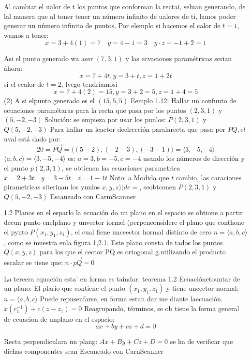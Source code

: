 

Al cambiar el ualor de t los puntos que conforman
la rectai, seluan generando, de lal manera que al
toner tener un número infinito de ualores de ti, lamos poder generar un número infinito de puntos, Por elemplo si hacemos el calor de $t=1$, wamos a tener:
$$
x=3+4(1)=7 \quad y=4-1=3 \quad y \cdot z=-1+2=1
$$

Asi el punto generado wa aser $(7,3,1)$
y las ecvaciones paramétricas serian áhora:
$$
x=7+4 t, y=3+t, z=1+2 t
$$
si el cealor de $t=2$, lvego tendríamosi
$$
x=7+4(2)=15, y=3+2=5, z=1+4=5
$$
(2)
A si elpunto generado es el $(15,5,5)$ Eemplo 1.12: Hallar un confunto de ecuaciones paramétaras para la recta que pasa por los puntos $(2,3,1)$ y $(5,-2,-3)$
Solución: se empieza por usar los punlos: $P(2,3,1)$ y $Q(5,-2,-3)$ Para hallar un leactor declrección paralarecta que pasa por $P Q, e l$ uval está dado por:
$$
20=\overrightarrow{P Q}=\langle(5-2),(-2-3),(-3-1)\rangle=\langle 3,-5,-4\rangle
$$
$\langle a, b, c\rangle=\langle 3,-5,-4\rangle$ es: $a=3, b=-5, c=-4$ usando los números de dirección y el punto $p(2,3,1)$, se obtienen las ecuaciones parametrica $x=2+3 t \quad y=3-5 t \quad z=1-4 t$
Noto: a Modida que $t$ cambio, las caraciones pirametricas siterinan los yunlos $x, y, z)(d e=$, seobtconen $P(2,3,1)$ y $Q(5,-2,-3)$
Escaneado con CarmScanner




1.2 Planos en el esparlo
la ecuación do un plano en el espacio se obtione a partir decun punto enelplano y unvector iormel (perpenconsidere el plano que conthone el pynto $P\left(x_1, y_1, z_1\right)$, el cual fiene unceector hormal distinto de cero $n=\langle a, b, c\rangle$, como se muestra enla figura 1,2.1. Este plano consta de tados los puntos $Q(x, y, z)$ para los que el cector PQ es ortogonal g.utilizando el producto escalar se tiene que: $n \cdot \overrightarrow{p Q}=0$

La tercera equación esta' en forma es taindar. teorema 1.2 Ecuaciónetountar
de un plano: El plario que contiene el punto $\left(x_1, y_1, z_1\right)$ y tiene uncector normal:
$n=\langle a, b, c\rangle$ Puede repusenfarse, en forma estan dar me diante laecuación.
$x\left(r_1^{-1}\right)+c\left(z-z_1\right)=0$
Reagrupando, términos, se ob tiene la forma general
de ecuacion de unplano en el espacio:
$$
a x+b y+c z+d=0
$$

Recta perpendiculara un plang: $A x+B y+C z+D=0$
se ha de verificar que dichas componentes sean
Escaneado con CarnScanner


